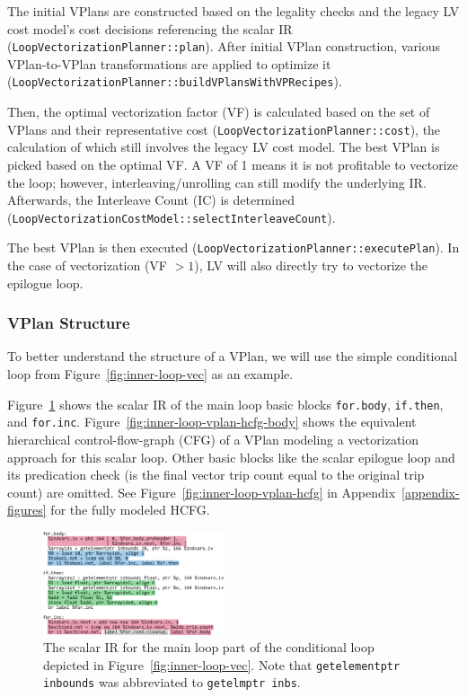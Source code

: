 \documentclass[sigplan,11pt,nonacm]{acmart}
\begin{document}
The initial VPlans are constructed based on the legality checks and the legacy LV cost model's 
cost decisions referencing the scalar IR (\texttt{LoopVectorizationPlanner::\allowbreak plan}). 
After initial VPlan construction, various VPlan-to-VPlan 
transformations are applied to optimize it 
(\texttt{LoopVectorizationPlanner::\allowbreak buildVPlansWithVPRecipes}).

Then, the optimal vectorization factor (VF) is calculated based on the set of VPlans and their 
representative cost (\texttt{LoopVectorizationPlanner::\allowbreak cost}), the calculation of 
which still involves the legacy LV cost model.
The best VPlan is picked based on the optimal VF. A VF of 1 means it is not profitable to vectorize 
the loop; however, interleaving/unrolling can still modify the underlying IR. Afterwards, the 
Interleave Count (IC) is determined 
(\texttt{LoopVectorizationCostModel::\allowbreak selectInterleaveCount}).

The best VPlan is then executed (\texttt{LoopVectorizationPlanner::\allowbreak executePlan}). In the 
case of vectorization (VF $>1$), LV will also directly try to vectorize the epilogue loop.

\subsubsection{VPlan Structure}
To better understand the structure of a VPlan, we will use the
simple conditional loop from Figure~\ref{fig:inner-loop-vec} as an example.

Figure~\ref{fig:inner-loop-scalar-ir} shows the scalar IR of the main loop basic blocks \texttt{for.body},
\texttt{if.then}, and \texttt{for.inc}. Figure~\ref{fig:inner-loop-vplan-hcfg-body} shows the equivalent
hierarchical control-flow-graph (CFG) of a VPlan modeling a vectorization approach for this 
scalar loop. Other basic blocks like the scalar epilogue loop and its predication check (is the final
vector trip count equal to the original trip count) are omitted. See Figure~\ref{fig:inner-loop-vplan-hcfg}
in Appendix~\ref{appendix-figures} for the fully modeled HCFG.


\begin{figure}
  \centering
  \includegraphics[width=0.475\textwidth]{images/inner-loop-scalar-loop-ir-color.png}
  \caption{The scalar IR for the main loop part of the conditional loop depicted in
  Figure~\ref{fig:inner-loop-vec}. Note that \texttt{getelementptr inbounds}
  was abbreviated to \texttt{getelmptr inbs}.}
  \label{fig:inner-loop-scalar-ir}
\end{figure}
\end{document}
